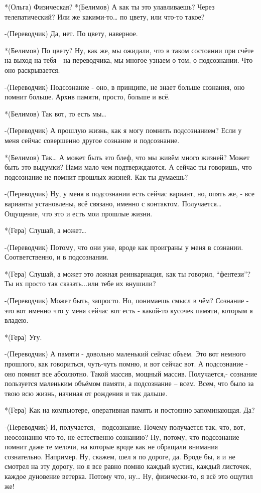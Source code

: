 *(Ольга) Физическая?
*(Белимов) А как ты это улавливаешь? Через телепатический? Или же какими-то… по цвету, или что-то такое?

-(Переводчик) Да, нет. По цвету, наверное.

*(Белимов) По цвету? Ну, как же, мы ожидали, что в таком состоянии при счёте на выход на тебя - на переводчика, мы многое узнаем о том, о подсознании. Что оно раскрывается.

-(Переводчик) Подсознание  - оно, в принципе, не знает больше сознания, оно помнит больше. Архив памяти, просто, больше и всё.

*(Белимов) Так вот, то есть мы…

-(Переводчик) А прошлую жизнь, как я могу помнить подсознанием? Если у меня сейчас совершенно другое сознание и подсознание.

*(Белимов) Так… А может быть это блеф, что мы живём много жизней? Может быть это выдумки? Нами мало чем подтверждаются. А сейчас ты говоришь, что подсознание не помнит прошлых жизней. Как ты думаешь?

-(Переводчик) Ну, у меня в подсознании есть сейчас вариант, но, опять же, - все варианты установлены, всё связано, именно с контактом. Получается… Ощущение, что это и есть мои прошлые жизни.

*(Гера) Слушай, а может…

-(Переводчик) Потому, что они уже, вроде как проиграны у меня в сознании. Соответственно, и в подсознании.

*(Гера) Слушай, а может это ложная реинкарнация, как ты говорил, “фентези”? Ты их просто так сказать...или тебе их внушили?

-(Переводчик) Может быть, запросто. Но, понимаешь смысл в чём? Сознание - это вот именно что у меня сейчас вот есть - какой-то кусочек памяти, которым я владею. 

*(Гера) Угу.

-(Переводчик) А памяти - довольно маленький сейчас объем. Это вот немного прошлого, как говориться, чуть-чуть помню, и вот сейчас вот. А подсознание - оно помнит все абсолютно. Такой массив, мощный массив. Получается,- сознание пользуется маленьким объёмом памяти, а  подсознание – всем. Всем, что было за твою всю жизнь, начиная от рождения и так дальше.

*(Гера) Как на компьютере, оперативная память и постоянно запоминающая. Да?

-(Переводчик) И, получается, - подсознание. Почему получается так, что, вот, неосознанно что-то, не естественно сознанию? Ну, потому, что подсознание помнит даже те мелочи, на которые вроде как не обращали внимания сознательно. Например. Ну, скажем, шел я по дороге, да. Вроде бы, я и не смотрел на эту дорогу, но я все равно помню каждый кустик, каждый листочек, каждое дуновение ветерка. Потому что, ну… Ну, физически-то, я всё это ощутил же!

